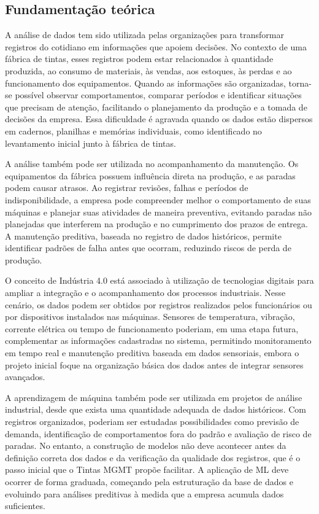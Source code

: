 \documentclass[12pt,a4paper]{article}
\begin{document}
\subsection{Fundamentação teórica}
A análise de dados tem sido utilizada pelas organizações para transformar registros do cotidiano em informações que apoiem decisões. No contexto de uma fábrica de tintas, esses registros podem estar relacionados à quantidade produzida, ao consumo de materiais, às vendas, aos estoques, às perdas e ao funcionamento dos equipamentos. Quando as informações são organizadas, torna-se possível observar comportamentos, comparar períodos e identificar situações que precisam de atenção, facilitando o planejamento da produção e a tomada de decisões da empresa. Essa dificuldade é agravada quando os dados estão dispersos em cadernos, planilhas e memórias individuais, como identificado no levantamento inicial junto à fábrica de tintas.

A análise também pode ser utilizada no acompanhamento da manutenção. Os equipamentos da fábrica possuem influência direta na produção, e as paradas podem causar atrasos. Ao registrar revisões, falhas e períodos de indisponibilidade, a empresa pode compreender melhor o comportamento de suas máquinas e planejar suas atividades de maneira preventiva, evitando paradas não planejadas que interferem na produção e no cumprimento dos prazos de entrega. A manutenção preditiva, baseada no registro de dados históricos, permite identificar padrões de falha antes que ocorram, reduzindo riscos de perda de produção.

O conceito de Indústria 4.0 está associado à utilização de tecnologias digitais para ampliar a integração e o acompanhamento dos processos industriais. Nesse cenário, os dados podem ser obtidos por registros realizados pelos funcionários ou por dispositivos instalados nas máquinas. Sensores de temperatura, vibração, corrente elétrica ou tempo de funcionamento poderiam, em uma etapa futura, complementar as informações cadastradas no sistema, permitindo monitoramento em tempo real e manutenção preditiva baseada em dados sensoriais, embora o projeto inicial foque na organização básica dos dados antes de integrar sensores avançados.

A aprendizagem de máquina também pode ser utilizada em projetos de análise industrial, desde que exista uma quantidade adequada de dados históricos. Com registros organizados, poderiam ser estudadas possibilidades como previsão de demanda, identificação de comportamentos fora do padrão e avaliação de risco de paradas. No entanto, a construção de modelos não deve acontecer antes da definição correta dos dados e da verificação da qualidade dos registros, que é o passo inicial que o Tintas MGMT propõe facilitar. A aplicação de ML deve ocorrer de forma graduada, começando pela estruturação da base de dados e evoluindo para análises preditivas à medida que a empresa acumula dados suficientes.
\end{document}
